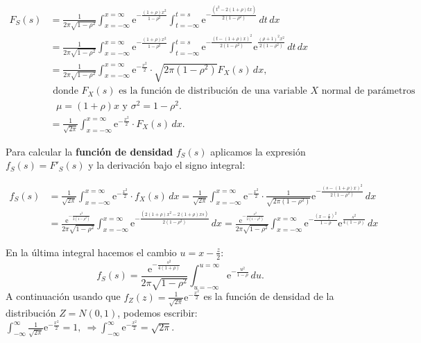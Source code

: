 \documentclass[]{book}
\begin{document}
\[
\begin{array}{rl}
F_S(s) & =  \frac{1}{2\pi\sqrt{1-\rho^2}} \int_{x=-\infty}^{x=\infty} \mathrm{e}^{-\frac{(1+\rho)x^2}{1-\rho^2}}\int_{t=-\infty}^{t=s} \mathrm{e}^{-\frac{(t^2-2(1+\rho) t x)}{2(1-\rho^2)}}\, dt\, dx \\ & = \frac{1}{2\pi\sqrt{1-\rho^2}} \int_{x=-\infty}^{x=\infty} \mathrm{e}^{-\frac{(1+\rho)x^2}{1-\rho^2}}\int_{t=-\infty}^{t=s} \mathrm{e}^{-\frac{(t-(1+\rho)x)^2}{2(1-\rho^2)}} \mathrm{e}^{\frac{(\rho+1)^2 x^2}{2(1-\rho^2)}}\, dt\, dx  \\ & = \frac{1}{2\pi\sqrt{1-\rho^2}} \int_{x=-\infty}^{x=\infty} \mathrm{e}^{-\frac{x^2}{2}}\cdot \sqrt{2\pi (1-\rho^2)} F_X(s)\, dx, \\ & \mbox{ donde $F_X(s)$ es la función de distribución de una variable $X$ normal de parámetros} \\ & \mbox{ $\mu =(1+\rho)x$ y $\sigma^2=1-\rho^2$.} \\ & = \frac{1}{\sqrt{2\pi}}\int_{x=-\infty}^{x=\infty} \mathrm{e}^{-\frac{x^2}{2}}\cdot F_X(s)\, dx.
\end{array}
\]

Para calcular la \textbf{función de densidad} \(f_S(s)\) aplicamos la expresión \(f_S(s)=F'_S(s)\) y la derivación bajo el signo integral:

\[
\begin{array}{rl}
f_S(s) & = \frac{1}{\sqrt{2\pi}}\int_{x=-\infty}^{x=\infty} \mathrm{e}^{-\frac{x^2}{2}}\cdot f_X(s)\, dx = \frac{1}{\sqrt{2\pi}}\int_{x=-\infty}^{x=\infty} \mathrm{e}^{-\frac{x^2}{2}}\cdot \frac{1}{\sqrt{2\pi (1-\rho^2)}}\mathrm{e}^{-\frac{(s-(1+\rho)x)^2}{2(1-\rho^2)}}\, dx \\ & = \frac{\mathrm{e}^{-\frac{s^2}{2(1-\rho^2)}}}{2\pi\sqrt{1-\rho^2}} \int_{x=-\infty}^{x=\infty} \mathrm{e}^{-\frac{(2(1+\rho) x^2-2(1+\rho)xs)}{2(1-\rho^2)}}\, dx= \frac{\mathrm{e}^{-\frac{s^2}{2(1-\rho^2)}}}{2\pi\sqrt{1-\rho^2}} \int_{x=-\infty}^{x=\infty} \mathrm{e}^{-\frac{\left(x-\frac{s}{2}\right)^2}{1-\rho}}\mathrm{e}^{\frac{s^2}{4(1-\rho)}}\, dx
\end{array}
\]

En la última integral hacemos el cambio \(u=x-\frac{z}{2}\):
\[
f_S(s)  =\frac{\mathrm{e}^{-\frac{s^2}{4(1+\rho)}}}{2\pi\sqrt{1-\rho^2}} \int_{u=-\infty}^{u=\infty} \mathrm{e}^{-\frac{u^2}{1-\rho}}\, du.
\]
A continuación usando que \(f_Z(z)=\frac{1}{\sqrt{2\pi}}\mathrm{e}^{-\frac{x^2}{2}}\) es la función de densidad de la distribución \(Z=N(0,1)\), podemos escribir: \(\int_{-\infty}^\infty \frac{1}{\sqrt{2\pi}}\mathrm{e}^{-\frac{x^2}{2}}=1,\ \Rightarrow \int_{-\infty}^\infty \mathrm{e}^{-\frac{x^2}{2}}=\sqrt{2\pi}.\)
\end{document}
